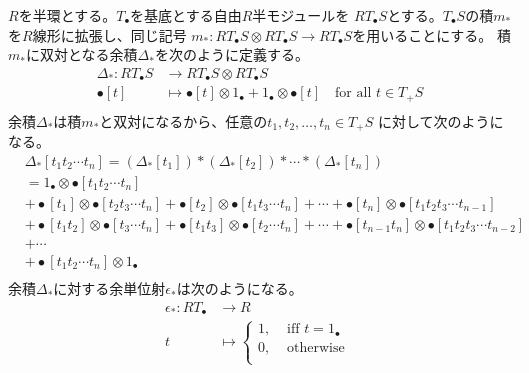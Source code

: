 	$R$を半環とする。$T_\bullet$を基底とする自由$R$半モジュールを
	$RT_\bullet S$とする。$T_\bullet S$の積$m_*$を$R$線形に拡張し、同じ記号
	$m_*:RT_\bullet S\otimes RT_\bullet S\to RT_\bullet S$を用いることにする。
	積$m_*$に双対となる余積$\Delta_*$を次のように定義する。
	\begin{equation}\begin{split} %
		\Delta_*: RT_\bullet S &\to  RT_\bullet S\otimes RT_\bullet S \\
			\bullet[t] &\mapsto \bullet[t]\otimes 1_\bullet + 1_\bullet\otimes \bullet[t] \quad\text{for all }t\in T_+S \\
	\end{split}\end{equation} %
	余積$\Delta_*$は積$m_*$と双対になるから、任意の$t_1,t_2,\dots,t_n\in T_+S$
	に対して次のようになる。
	\begin{equation}\begin{split} %
		&\Delta_*[t_1t_2\cdots t_n]
			= (\Delta_*[t_1])*(\Delta_*[t_2])*\cdots*(\Delta_*[t_n]) \\
			&= 1_\bullet\otimes \bullet[t_1t_2\cdots t_n] \\
			&+ \bullet[t_1]\otimes \bullet[t_2t_3\cdots t_n] 
			+ \bullet[t_2]\otimes \bullet[t_1t_3\cdots t_n]
			+ \cdots
			+ \bullet[t_n]\otimes \bullet[t_1t_2t_3 \cdots t_{n-1}] \\
			&+ \bullet[t_1t_2]\otimes \bullet[t_3\cdots t_n] 
			+ \bullet[t_1t_3]\otimes \bullet[t_2\cdots t_n]
			+ \cdots
			+ \bullet[t_{n-1}t_n]\otimes \bullet[t_1t_2t_3 \cdots t_{n-2}] \\
			&+\cdots \\
			&+ \bullet[t_1t_2\cdots t_n]\otimes 1_\bullet \\
	\end{split}\end{equation} %
	余積$\Delta_*$に対する余単位射$\epsilon_*$は次のようになる。
	\begin{equation}\begin{split} %
		\epsilon_*: RT_\bullet &\to R \\
			t &\mapsto \begin{cases} %
				1, &\text{ iff }t = 1_\bullet \\
				0, &\text{ otherwise } \\
			\end{cases} %
	\end{split}\end{equation} %

